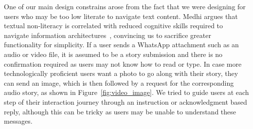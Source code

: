 One of our main design constrains arose from the fact that we were designing for users who may be too low literate to navigate text content. Medhi argues that textual non-literacy is correlated with reduced cognitive skills required to navigate information architectures~\cite{medhi_2015_user}, convincing us to sacrifice greater functionality for simplicity. If a user sends a WhatsApp attachment such as an audio or video file, it is assumed to be a story submission and there is no confirmation required as users may not know how to read or type. In case more technologically proficient users want a photo to go along with their story, they can send an image, which is then followed by a request for the corresponding audio story, as shown in Figure~\ref{fig:video_image}. We tried to guide users at each step of their interaction journey through an instruction or acknowledgment based reply, although this can be tricky as users may be unable to understand these messages.

